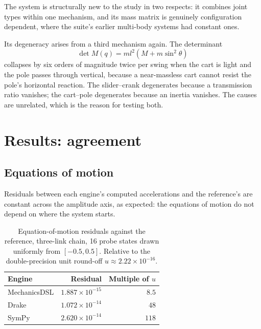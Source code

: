 \documentclass[review,12pt]{elsarticle}
\begin{document}
The system is structurally new to the study in two respects: it combines joint
types within one mechanism, and its mass matrix is genuinely configuration
dependent, where the suite's earlier multi-body systems had constant ones.

Its degeneracy arises from a third mechanism again. The determinant
\begin{equation}
\det M(q) = m l^{2}\left(M + m\sin^{2}\theta\right)
\label{eq:detM}
\end{equation}
collapses by six orders of magnitude twice per swing when the cart is light and
the pole passes through vertical, because a near-massless cart cannot resist the
pole's horizontal reaction. The slider--crank degenerates because a transmission
ratio vanishes; the cart--pole degenerates because an inertia vanishes. The
causes are unrelated, which is the reason for testing both.

\section{Results: agreement}\label{sec:agreement}

\subsection{Equations of motion}
Residuals between each engine's computed accelerations and the reference's are
constant across the amplitude axis, as expected: the equations of motion do not
depend on where the system starts.

\begin{table}[!htbp]
\centering
\caption{Equation-of-motion residuals against the reference, three-link chain,
16 probe states drawn uniformly from $[-0.5,0.5]$. Relative to the
double-precision unit round-off $u \approx 2.22\times10^{-16}$.}
\label{tab:eom}
\begin{tabular}{@{}lrr@{}}
\toprule
\textbf{Engine} & \textbf{Residual} & \textbf{Multiple of $u$} \\
\midrule
MechanicsDSL & $1.887\times10^{-15}$ & $8.5$ \\
Drake        & $1.072\times10^{-14}$ & $48$ \\
SymPy        & $2.620\times10^{-14}$ & $118$ \\
\bottomrule
\end{tabular}
\end{table}
\end{document}
